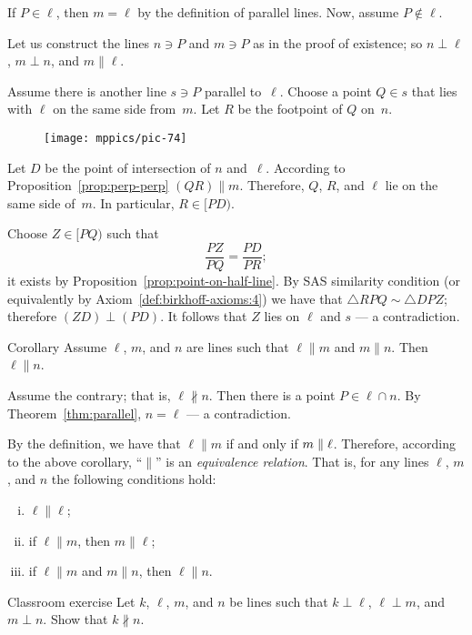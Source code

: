 If $P\in\ell$, then $m=\ell$ by the definition of parallel lines.
Now, assume $P\notin\ell$.

Let us construct the lines $n\ni P$ and $m\ni P$ as in the proof of existence; so $n\perp \ell$, $m\perp n$, and $m\parallel \ell$.

Assume there is another line $s\ni P$ parallel to~$\ell$.
Choose a point $Q\in s$ that lies with $\ell$ on the same side from~$m$.
Let $R$ be the footpoint of $Q$ on~$n$.

\begin{figure}[!ht]
\centering
\texttt{[image: mppics/pic-74]}
\end{figure}

Let $D$ be the point of intersection of $n$ and~$\ell$.
According to Proposition~\ref{prop:perp-perp} $(QR)\parallel m$. 
Therefore, $Q$, $R$, and $\ell$ lie on the same side of~$m$. 
In particular, $R\in [P D)$.

Choose $Z\in [P Q)$ such that 
$$\frac{PZ}{PQ}=\frac{PD}{PR};$$
it exists by Proposition~\ref{prop:point-on-half-line}.
By SAS similarity condition (or equivalently by Axiom~\ref{def:birkhoff-axioms:4})
we have that $\triangle RPQ\sim \triangle DPZ$;
therefore $(Z D)\perp(P D)$.
It follows that $Z$ lies on $\ell$ and $s$ --- a contradiction.\qeds

\begin{thm}{Corollary}\label{cor:parallel-1}
Assume $\ell$, $m$, and $n$ are lines
such that $\ell\parallel m$ and $m\parallel n$.
Then $\ell\parallel n$.
\end{thm}

Assume the contrary; that is, $\ell\nparallel n$.
Then there is a point $P\in \ell\cap n$.
By Theorem~\ref{thm:parallel},
$n=\ell$ --- a contradiction.
\qeds

By the definition, we have that $\ell\parallel m$ if and only if $m\parallel \ell$.
Therefore, according to the above corollary, ``$\parallel$'' is an 
\emph{equivalence relation}.
That is, for any lines $\ell$, $m$, and $n$ the following conditions hold:
\begin{enumerate}[(i)]
\item $\ell\parallel \ell$;
\item if $\ell\parallel m$, then $m\parallel \ell$;
\item if $\ell\parallel m$ and $m\parallel n$, then 
$\ell\parallel n$.
\end{enumerate}

\begin{thm}{Classroom exercise}\label{ex:perp-perp}
Let $k$, $\ell$, $m$, and $n$ be lines such that $k\perp \ell$, $\ell\perp m$, and $m\perp n$.
Show that $k\nparallel n$.
\end{thm}

